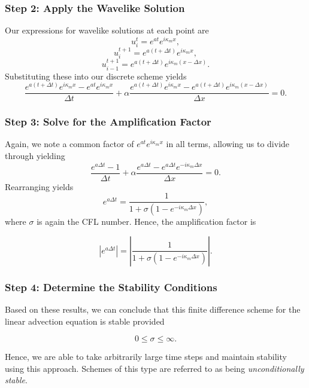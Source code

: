 \subsubsection{Step 2: Apply the Wavelike Solution}
Our expressions for wavelike solutions at each point are
\begin{equation}
	u_{i}^t = e^{at} e^{i \kappa_m x},
\end{equation}
\begin{equation}
	u_{i}^{t+1} = e^{a(t + \Delta t)} e^{i \kappa_m x},
\end{equation}
\begin{equation}
	u_{i-1}^{t+1} = e^{a(t + \Delta t)} e^{i \kappa_m (x - \Delta x)}.
\end{equation}
Substituting these into our discrete scheme yields
\begin{equation}
	\frac{e^{a(t + \Delta t)} e^{i \kappa_m x} - e^{at} e^{i \kappa_m x}}{\Delta t} +  \alpha \frac{e^{a(t + \Delta t)} e^{i \kappa_m x} - e^{a(t + \Delta t)} e^{i \kappa_m (x - \Delta x)}}{\Delta x} = 0.
\end{equation}

\subsubsection{Step 3: Solve for the Amplification Factor}
Again, we note a common factor of $e^{at} e^{i \kappa_m x}$ in all terms, allowing us to divide through yielding
\begin{equation}
	\frac{e^{a\Delta t} - 1}{\Delta t} +  \alpha \frac{e^{a\Delta t} - e^{a\Delta t} e^{-i \kappa_m \Delta x}}{\Delta x} = 0.
\end{equation}
Rearranging yields
\begin{equation}
	e^{a\Delta t} = \frac{1}{1 + \sigma \left( 1 - e^{-i \kappa_m \Delta x} \right)},
\end{equation}
where $\sigma$ is again the CFL number. Hence, the amplification factor is
\begin{eqBox}
\begin{equation}
	|e^{a\Delta t}| = \left| \frac{1}{1 + \sigma \left( 1 - e^{-i \kappa_m \Delta x} \right)} \right|.
\end{equation}
\end{eqBox}

\subsubsection{Step 4: Determine the Stability Conditions}
Based on these results, we can conclude that this finite difference scheme for the linear advection equation is stable provided
\begin{eqBox}
\begin{equation}
	0 \leq \sigma \leq \infty.
\end{equation}
\end{eqBox}
Hence, we are able to take arbitrarily large time steps and maintain stability using this approach. Schemes of this type are referred to as being {\it unconditionally stable}.

